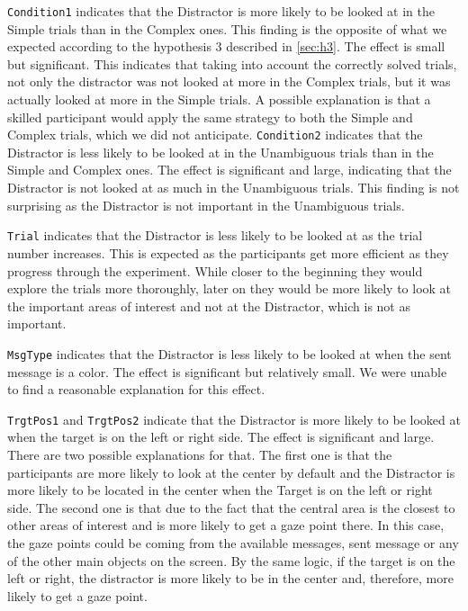 \texttt{Condition1} indicates that the Distractor is more likely to be looked at in the Simple trials than in the Complex ones. This finding is the opposite of what we expected according to the hypothesis 3 described in \autoref{sec:h3}. The effect is small but significant. This indicates that taking into account the correctly solved trials, not only the distractor was not looked at more in the Complex trials, but it was actually looked at more in the Simple trials. A possible explanation is that a skilled participant would apply the same strategy to both the Simple and Complex trials, which we did not anticipate. \texttt{Condition2} indicates that the Distractor is less likely to be looked at in the Unambiguous trials than in the Simple and Complex ones. The effect is significant and large, indicating that the Distractor is not looked at as much in the Unambiguous trials. This finding is not surprising as the Distractor is not important in the Unambiguous trials.

\texttt{Trial} indicates that the Distractor is less likely to be looked at as the trial number increases. This is expected as the participants get more efficient as they progress through the experiment. While closer to the beginning they would explore the trials more thoroughly, later on they would be more likely to look at the important areas of interest and not at the Distractor, which is not as important. 

\texttt{MsgType} indicates that the Distractor is less likely to be looked at when the sent message is a color. The effect is significant but relatively small. We were unable to find a reasonable explanation for this effect.

\texttt{TrgtPos1} and \texttt{TrgtPos2} indicate that the Distractor is more likely to be looked at when the target is on the left or right side. The effect is significant and large. There are two possible explanations for that. The first one is that the participants are more likely to look at the center by default and the Distractor is more likely to be located in the center when the Target is on the left or right side. The second one is that due to the fact that the central area is the closest to other areas of interest and is more likely to get a gaze point there. In this case, the gaze points could be coming from the available messages, sent message or any of the other main objects on the screen. By the same logic, if the target is on the left or right, the distractor is more likely to be in the center and, therefore, more likely to get a gaze point.

